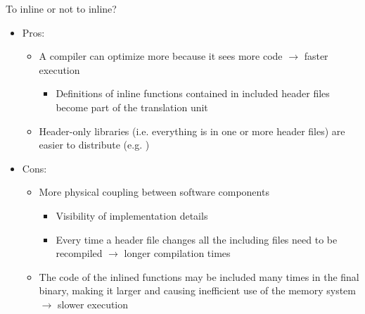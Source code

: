\begin{frame}{To inline or not to inline?}

  \begin{itemize}
  \item Pros:
    \begin{itemize}
    \item A compiler can optimize more because it sees more code $\rightarrow$
      faster execution
      \begin{itemize}
      \item Definitions of inline functions contained in included header files
        become part of the translation unit
      \end{itemize}
    \item Header-only libraries (i.e. everything is in one or more header files)
      are easier to distribute (e.g. )
    \end{itemize}
  \item Cons:
    \begin{itemize}
    \item More physical coupling between software components
      \begin{itemize}
      \item Visibility of implementation details
      \item Every time a header file changes all the including files need to be
        recompiled $\rightarrow$ longer compilation times
      \end{itemize}
    \item The code of the inlined functions may be included many times in the
      final binary, making it larger and causing inefficient use of the memory
      system $\rightarrow$ slower execution
    \end{itemize}
  \end{itemize}

\end{frame}

